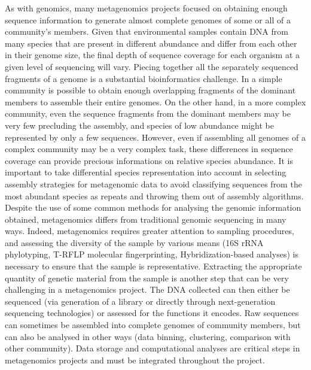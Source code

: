 As with genomics, many metagenomics projects focused on obtaining enough sequence information to generate almost complete genomes of some or all of a community’s members. Given that environmental samples contain DNA from many species that are present in different abundance and differ from each other in their genome size, the final depth of sequence coverage for each organism at a given level of sequencing will vary. Piecing together all the separately sequenced fragments of a genome is a substantial bioinformatics challenge. In a simple community is possible to obtain enough overlapping fragments of the dominant members to assemble their entire genomes. On the other hand, in a more complex community, even the sequence fragments from the dominant members may be very few precluding the assembly, and species of low abundance might be represented by only a few sequences. However, even if assembling all genomes of a complex community may be a very complex task, these differences in sequence coverage can provide precious informations on relative species abundance. It is important to take differential species representation into account in selecting assembly strategies for metagenomic data to avoid classifying sequences from the most abundant species as repeats and throwing them out of assembly algorithms.\\
Despite the use of some common methods for analysing the genomic information obtained, metagenomics differs from traditional genomic sequencing in many ways. Indeed, metagenomics requires greater attention to sampling procedures, and assessing the diversity of the sample by various means (16S rRNA phylotyping, T-RFLP molecular fingerprinting, Hybridization-based analyses) is necessary to ensure that the sample is representative. Extracting the appropriate quantity of genetic material from the sample is another step that can be very challenging in a metagenomics project. The DNA collected can then either be sequenced (via generation of a library or directly through next-generation sequencing technologies) or assessed for the functions it encodes. Raw sequences can sometimes be assembled into complete genomes of community members, but can also be analysed in other ways (data binning, clustering, comparison with other community). Data storage and computational analyses are critical steps in metagenomics projects and must be integrated throughout the project.\\

